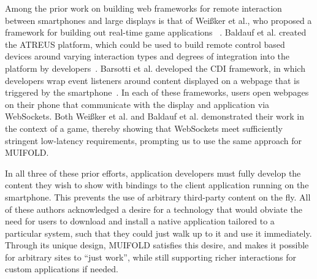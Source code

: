 Among the prior work on building web frameworks for remote interaction between smartphones and large displays is that of
Weißker et al., who proposed a
framework for building out real-time game applications ~\cite{weisker_massive_2016}. Baldauf et al. created the ATREUS
platform, which could be used to build remote control based
devices around varying interaction types and degrees of integration
into the platform by developers~\cite{baldauf_your_2016}. Barsotti
et al. developed the CDI framework, in which developers wrap event listeners around content displayed on a webpage
that is triggered by the smartphone~\cite{barsotti_web_2017}.
In each of these frameworks, users open webpages on their phone that communicate with the display and application via WebSockets.
Both Weißker et al. and Baldauf et al. demonstrated their
work in the context of a game, thereby showing that
WebSockets meet sufficiently stringent low-latency requirements, prompting us to use the same approach for MUIFOLD.

In all three of these prior efforts, application
developers must fully develop the content they wish to show with bindings to the client application running on the smartphone. This prevents the use of arbitrary third-party content on the fly.
All of these authors acknowledged a desire for a technology that would obviate the need for users to download and install a native application tailored to a particular system, such that they could just walk up to it and use it immediately. Through its unique design, MUIFOLD satisfies this desire, and makes it possible for arbitrary sites to ``just work'', while still supporting richer interactions for custom applications if needed.

